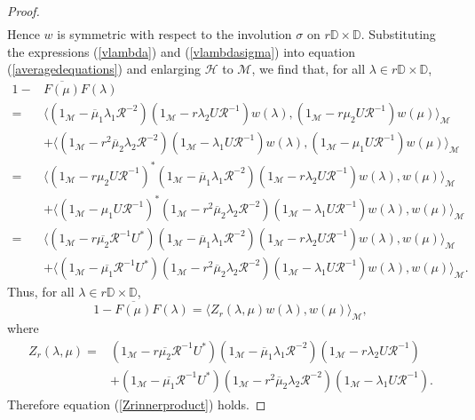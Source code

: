 \documentclass[10pt,a4paper]{amsart}
\begin{document}
\begin{proof}
\begin{align}
\end{align}
Hence $w$ is symmetric with respect to the involution $\sigma$ on $r\mathbb{D}\times\mathbb{D}$. Substituting the expressions (\ref{vlambda}) and (\ref{vlambdasigma}) into equation (\ref{averagedequations}) and enlarging $\mathcal{H}$ to $\mathcal{M}$, we find that, for all $\lambda \in r\mathbb{D}\times\mathbb{D}$,
\begin{align*}
1-&\overline{F(\mu)}F(\lambda) \\
= &\Big\langle(1_{\mathcal{M}}-\overline{\mu}_{1}\lambda_{1}\mathcal{R}^{-2})(1_{\mathcal{M}}-r\lambda_{2}U\mathcal{R}^{-1}) w(\lambda),(1_{\mathcal{M}}-r\mu_{2}U\mathcal{R}^{-1})w(\mu)\Big\rangle_{\mathcal{M}}  \\
&+\Big\langle (1_{\mathcal{M}}-r^{2} \overline{\mu}_{2}\lambda_{2}\mathcal{R}^{-2})(1_{\mathcal{M}}-\lambda_{1}U\mathcal{R}^{-1}) w(\lambda), (1_{\mathcal{M}}-\mu_{1}U\mathcal{R}^{-1}) w(\mu) \Big\rangle_{\mathcal{M}}\\
= & \Big\langle(1_{\mathcal{M}}-r\mu_{2}U\mathcal{R}^{-1})^{*}(1_{\mathcal{M}}-\overline{\mu}_{1}\lambda_{1}\mathcal{R}^{-2})(1_{\mathcal{M}}-r\lambda_{2}U\mathcal{R}^{-1}) w(\lambda),w(\mu)\Big\rangle_{\mathcal{M}}  \\
&+\Big\langle (1_{\mathcal{M}}-\mu_{1}U\mathcal{R}^{-1})^{*}(1_{\mathcal{M}}-r^{2} \overline{\mu}_{2}\lambda_{2}\mathcal{R}^{-2})(1_{\mathcal{M}}-\lambda_{1}U\mathcal{R}^{-1}) w(\lambda), w(\mu) \Big\rangle_{\mathcal{M}}\\
= &\Big\langle(1_{\mathcal{M}}-r\overline{\mu_{2}}\mathcal{R}^{-1}U^{*})(1_{\mathcal{M}}-\overline{\mu}_{1}\lambda_{1}\mathcal{R}^{-2})(1_{\mathcal{M}}-r\lambda_{2}U\mathcal{R}^{-1})w(\lambda),w(\mu)\Big\rangle_{\mathcal{M}}  \\
&+\Big\langle (1_{\mathcal{M}}-\overline{\mu_{1}}\mathcal{R}^{-1}U^{*})(1_{\mathcal{M}}-r^{2} \overline{\mu}_{2}\lambda_{2}\mathcal{R}^{-2})(1_{\mathcal{M}}-\lambda_{1}U\mathcal{R}^{-1}) w(\lambda), w(\mu) \Big\rangle_{\mathcal{M}}.
\end{align*}
Thus, for all $\lambda \in r\mathbb{D}\times\mathbb{D}$,
$$ 1-\overline{F(\mu)}F(\lambda) = \langle Z_{r}(\lambda,\mu) w(\lambda),w(\mu)\rangle_{\mathcal{M}}, $$
where
\begin{align*}
Z_{r}(\lambda,\mu) =& (1_{\mathcal{M}}-r\overline{\mu_{2}}\mathcal{R}^{-1}U^{*})(1_{\mathcal{M}}-\overline{\mu}_{1}\lambda_{1}\mathcal{R}^{-2})(1_{\mathcal{M}}- r\lambda_{2}U\mathcal{R}^{-1}) \\
& + (1_{\mathcal{M}}-\overline{\mu_{1}}\mathcal{R}^{-1}U^{*})(1_{\mathcal{M}}-r^{2} \overline{\mu}_{2}\lambda_{2}\mathcal{R}^{-2})(1_{\mathcal{M}}-\lambda_{1}U\mathcal{R}^{-1}).
\end{align*}
Therefore equation (\ref{Zrinnerproduct}) holds.\end{proof}
\end{document}

